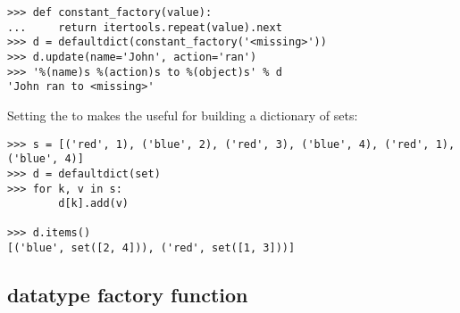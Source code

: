\begin{verbatim}
>>> def constant_factory(value):
...     return itertools.repeat(value).next
>>> d = defaultdict(constant_factory('<missing>'))
>>> d.update(name='John', action='ran')
>>> '%(name)s %(action)s to %(object)s' % d
'John ran to <missing>'
\end{verbatim}

Setting the  to  makes the
 useful for building a dictionary of sets:

\begin{verbatim}
>>> s = [('red', 1), ('blue', 2), ('red', 3), ('blue', 4), ('red', 1), ('blue', 4)]
>>> d = defaultdict(set)
>>> for k, v in s:
        d[k].add(v)

>>> d.items()
[('blue', set([2, 4])), ('red', set([1, 3]))]
\end{verbatim}



\subsection{ datatype factory function \label{named-tuple-factory}}

